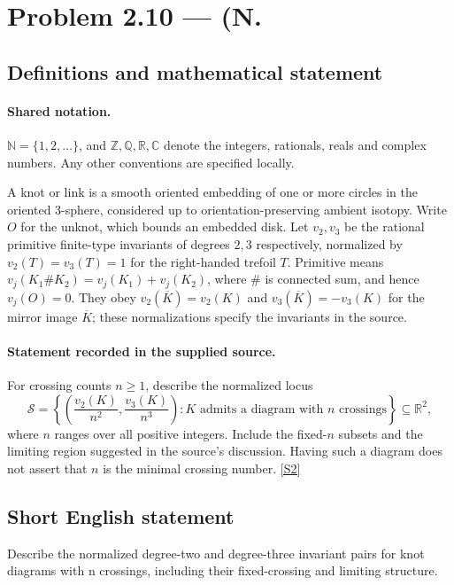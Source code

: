 \documentclass[11pt]{article}
\newcommand{\sref}[2]{\hyperlink{source:#1:#2}{[S#2]}}
\begin{document}
\section{Problem 2.10 — (N.}\label{statement}

\subsection{Definitions and mathematical statement}

\paragraph{Shared notation.}$\mathbb N=\{1,2,\ldots\}$, and $\mathbb Z,\mathbb Q,\mathbb R,\mathbb C$ denote the integers, rationals, reals and complex numbers. Any other conventions are specified locally.


A knot or link is a smooth oriented embedding of one or more circles in the oriented $3$-sphere, considered up to orientation-preserving ambient isotopy. Write $O$ for the unknot, which bounds an embedded disk. Let $v_2,v_3$ be the rational primitive finite-type invariants of degrees $2,3$ respectively, normalized by $v_2(T)=v_3(T)=1$ for the right-handed trefoil $T$. Primitive means $v_j(K_1\#K_2)=v_j(K_1)+v_j(K_2)$, where $\#$ is connected sum, and hence $v_j(O)=0$. They obey $v_2(\overline K)=v_2(K)$ and $v_3(\overline K)=-v_3(K)$ for the mirror image $\overline K$; these normalizations specify the invariants in the source.
\paragraph{Statement recorded in the supplied source.}
For crossing counts $n\ge1$, describe the normalized locus
\[\mathcal S=\left\{\left(\frac{v_2(K)}{n^2},\frac{v_3(K)}{n^3}\right):K\text{ admits a diagram with }n\text{ crossings}\right\}\subseteq\mathbb R^2,\]
where $n$ ranges over all positive integers. Include the fixed-$n$ subsets and the limiting region suggested in the source's discussion. Having such a diagram does not assert that $n$ is the minimal crossing number. \sref{statement}{2}
\subsection{Short English statement}
Describe the normalized degree-two and degree-three invariant pairs for knot diagrams with n crossings, including their fixed-crossing and limiting structure.
\end{document}
